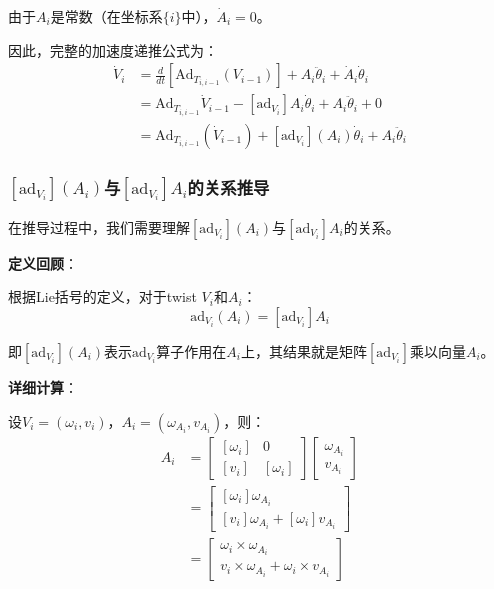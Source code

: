 \documentclass[12pt,a4paper]{article}
\begin{document}
由于$A_i$是常数（在坐标系$\{i\}$中），$\dot{A}_i = 0$。

因此，完整的加速度递推公式为：
\begin{align}
\dot{V}_i &= \frac{d}{dt}[\text{Ad}_{T_{i,i-1}}(V_{i-1})] + A_i \ddot{\theta}_i + \dot{A}_i \dot{\theta}_i \\
&= \text{Ad}_{T_{i,i-1}} \dot{V}_{i-1} - [\text{ad}_{V_i}] A_i \dot{\theta}_i + A_i \ddot{\theta}_i + 0 \\
&= \text{Ad}_{T_{i,i-1}}(\dot{V}_{i-1}) + [\text{ad}_{V_i}](A_i) \dot{\theta}_i + A_i \ddot{\theta}_i
\label{eq:acceleration_recursive}
\end{align}

\subsubsection{$[\text{ad}_{V_i}](A_i)$与$[\text{ad}_{V_i}] A_i$的关系推导}

在推导过程中，我们需要理解$[\text{ad}_{V_i}](A_i)$与$[\text{ad}_{V_i}] A_i$的关系。

\textbf{定义回顾}：

根据Lie括号的定义，对于twist $V_i$和$A_i$：
\begin{equation}
\text{ad}_{V_i}(A_i) = [\text{ad}_{V_i}] A_i
\end{equation}

即$[\text{ad}_{V_i}](A_i)$表示$\text{ad}_{V_i}$算子作用在$A_i$上，其结果就是矩阵$[\text{ad}_{V_i}]$乘以向量$A_i$。

\textbf{详细计算}：

设$V_i = (\omega_i, v_i)$，$A_i = (\omega_{A_i}, v_{A_i})$，则：
\begin{align}
[\text{ad}_{V_i}] A_i &= \begin{bmatrix}
[\omega_i] & 0 \\
[v_i] & [\omega_i]
\end{bmatrix} \begin{bmatrix}
\omega_{A_i} \\
v_{A_i}
\end{bmatrix} \\
&= \begin{bmatrix}
[\omega_i] \omega_{A_i} \\
[v_i] \omega_{A_i} + [\omega_i] v_{A_i}
\end{bmatrix} \\
&= \begin{bmatrix}
\omega_i \times \omega_{A_i} \\
v_i \times \omega_{A_i} + \omega_i \times v_{A_i}
\end{bmatrix}
\end{align}
\end{document}
